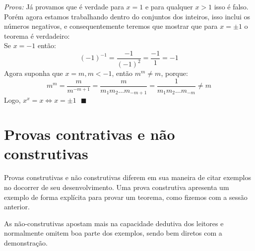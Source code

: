 \documentclass[main.tex]{subfiles}
\begin{document}
\textit{Prova: } Já provamos que é verdade para $x=1$ e para qualquer $x>1$ isso é falso. Porém agora estamos trabalhando dentro do conjuntos dos inteiros, isso inclui os números negativos, e consequentemente teremos que mostrar que para $x = \pm 1$ o teorema é verdadeiro:
\\
Se $x=-1$ então:
$$(-1)^{-1} = \frac{-1}{(-1)^2} = \frac{-1}{1} = -1$$
Agora suponha que $x = m, m < -1$, então $m^m \neq m$, porque:
$$m^m = \frac{m}{m^{-m+1}}= \frac{m}{m_1m_2 \dots m_{-m+1}} = \frac{1}{m_1m_2 \dots m_{-m}} \neq m$$
Logo, $x^x = x \Leftrightarrow x= \pm 1 \ \ \ \blacksquare$

\section{Provas contrativas e não construtivas}
Provas construtivas e não construtivas diferem em sua maneira de citar exemplos no docorrer de seu desenvolvimento. Uma prova construtiva apresenta um exemplo de forma explícita para provar um teorema, como fizemos com a sessão anterior.
\par 

As não-construtivas apostam mais na capacidade dedutiva dos leitores e normalmente omitem boa parte dos exemplos, sendo bem diretos com a demonstração.


\end{document}
